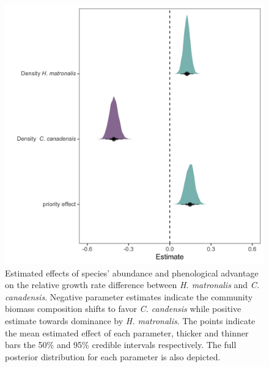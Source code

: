 \documentclass{article}\usepackage[]{graphicx}\usepackage[]{color}
\begin{document}
\begin{figure}[h!]
    \centering
\includegraphics[width=\textwidth]{..//figure/mu_plots.jpeg}
    \caption{Estimated effects of species' abundance and phenological advantage on the relative growth rate difference between \textit{H. matronalis} and \textit{C. canadensis}. Negative parameter estimates indicate the community biomass composition shifts to favor \textit{C. candensis} while positive estimate towards dominance by \textit{ H. matronalis}. The points indicate the mean estimated effect of each parameter, thicker  and thinner bars the 50\% and 95\% credible intervals respectively. The full posterior distribution for each parameter is also depicted. 
    } 
    \label{fig:RGRD}
\end{figure}
\end{document}
